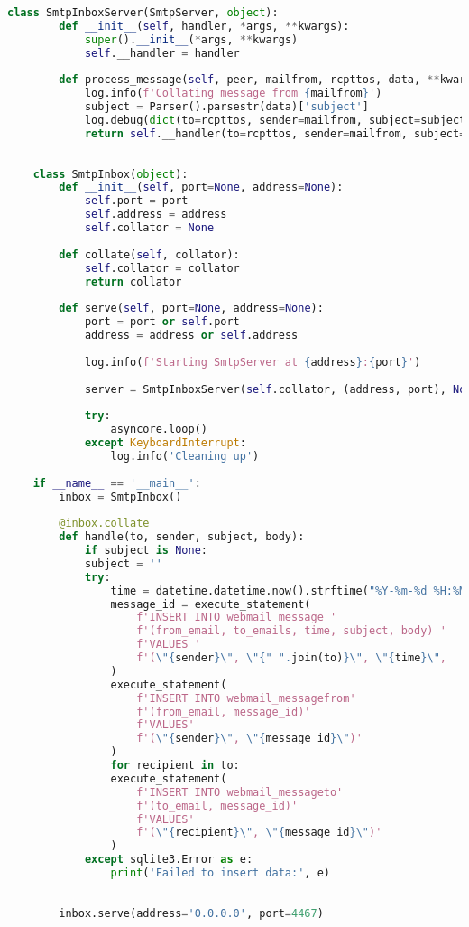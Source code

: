 \begin{lstlisting}[gobble=8, language=Python, caption={Синтаксис поддерживаемых команд\label{lst:inbox}}]
	class SmtpInboxServer(SmtpServer, object):
		def __init__(self, handler, *args, **kwargs):
			super().__init__(*args, **kwargs)
			self.__handler = handler
		
		def process_message(self, peer, mailfrom, rcpttos, data, **kwargs):
			log.info(f'Collating message from {mailfrom}')
			subject = Parser().parsestr(data)['subject']
			log.debug(dict(to=rcpttos, sender=mailfrom, subject=subject, body=data))
			return self.__handler(to=rcpttos, sender=mailfrom, subject=subject, body=data)
	
	
	class SmtpInbox(object):
		def __init__(self, port=None, address=None):
			self.port = port
			self.address = address
			self.collator = None
		
		def collate(self, collator):
			self.collator = collator
			return collator
		
		def serve(self, port=None, address=None):
			port = port or self.port
			address = address or self.address
			
			log.info(f'Starting SmtpServer at {address}:{port}')
			
			server = SmtpInboxServer(self.collator, (address, port), None, decode_data=True)
		
			try:
				asyncore.loop()
			except KeyboardInterrupt:
				log.info('Cleaning up')
				
	if __name__ == '__main__':
		inbox = SmtpInbox()
		
		@inbox.collate
		def handle(to, sender, subject, body):
			if subject is None:
			subject = ''
			try:
				time = datetime.datetime.now().strftime("%Y-%m-%d %H:%M:%S")
				message_id = execute_statement(
					f'INSERT INTO webmail_message '
					f'(from_email, to_emails, time, subject, body) '
					f'VALUES '
					f'(\"{sender}\", \"{" ".join(to)}\", \"{time}\", 	\"{subject}\", \"{body[10 + len(subject):]}\")'
				)
				execute_statement(
					f'INSERT INTO webmail_messagefrom'
					f'(from_email, message_id)'
					f'VALUES'
					f'(\"{sender}\", \"{message_id}\")'
				)
				for recipient in to:
				execute_statement(
					f'INSERT INTO webmail_messageto'
					f'(to_email, message_id)'
					f'VALUES'
					f'(\"{recipient}\", \"{message_id}\")'
				)
			except sqlite3.Error as e:
				print('Failed to insert data:', e)
			
			
		inbox.serve(address='0.0.0.0', port=4467)
\end{lstlisting}

